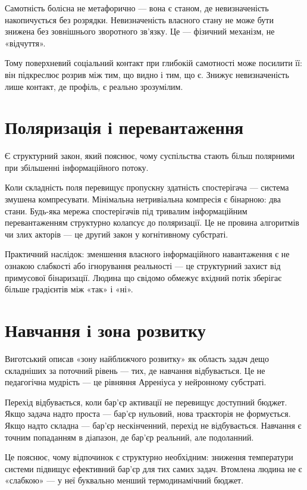 \documentclass[12pt, a4paper, openany]{book}
\begin{document}
Самотність болісна не метафорично --- вона є станом, де невизначеність накопичується без розрядки. Невизначеність власного стану не може бути знижена без зовнішнього зворотного зв'язку. Це — фізичний механізм, не «відчуття».

Тому поверхневий соціальний контакт при глибокій самотності може посилити її: він підкреслює розрив між тим, що видно і тим, що є. Знижує невизначеність лише контакт, де профіль, є реально зрозумілим.

\section{Поляризація і перевантаження}

Є структурний закон, який пояснює, чому суспільства стають більш полярними при збільшенні інформаційного потоку.

Коли складність поля перевищує пропускну здатність спостерігача --- система змушена компресувати. Мінімальна нетривіальна компресія є бінарною: два стани. Будь-яка мережа спостерігачів під тривалим інформаційним перевантаженням структурно колапсує до поляризації. Це не провина алгоритмів чи злих акторів --- це другий закон у когнітивному субстраті.

Практичний наслідок: зменшення власного інформаційного навантаження є не ознакою слабкості або ігнорування реальності --- це структурний захист від примусової бінаризації. Людина що свідомо обмежує вхідний потік зберігає більше градієнтів між «так» і «ні».

\section{Навчання і зона розвитку}

Виготський описав «зону найближчого розвитку» як область задач дещо складніших за поточний рівень --- тих, де навчання відбувається. Це не педагогічна мудрість --- це рівняння Арреніуса у нейронному субстраті.

Перехід відбувається, коли бар'єр активації не перевищує доступний бюджет. Якщо задача надто проста --- бар'єр нульовий, нова траєкторія не формується. Якщо надто складна --- бар'єр нескінченний, перехід не відбувається. Навчання є точним попаданням в діапазон, де бар'єр реальний, але подоланний.

Це пояснює, чому відпочинок є структурно необхідним: зниження температури системи підвищує ефективний бар'єр для тих самих задач. Втомлена людина не є «слабкою» --- у неї буквально менший термодинамічний бюджет.
\end{document}
